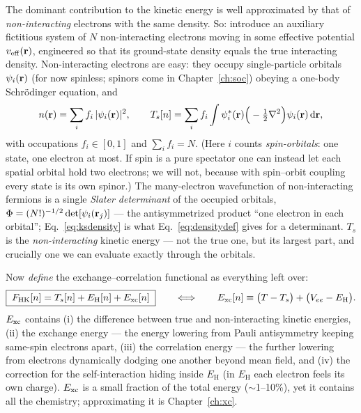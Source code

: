 The dominant contribution to the kinetic energy is well approximated by that
of \emph{non-interacting} electrons with the same density. So: introduce an
auxiliary fictitious system of $N$ non-interacting electrons moving in some
effective potential $v_{\mathrm{eff}}(\mathbf{r})$, engineered so that its ground-state
density equals the true interacting density. Non-interacting electrons are
easy: they occupy single-particle orbitals $\psi_i(\mathbf{r})$ (for now spinless;
spinors come in Chapter~\ref{ch:soc}) obeying a one-body Schr\"odinger
equation, and
\begin{equation}
n(\mathbf{r}) = \sum_{i} f_i\, |\psi_i(\mathbf{r})|^2 ,
\qquad
T_s[n] = \sum_i f_i \int \psi_i^*(\mathbf{r})
\Big(-\tfrac{1}{2}\nabla^2\Big) \psi_i(\mathbf{r})\,\mathrm{d}\mathbf{r},
\label{eq:ksdensity}
\end{equation}
with occupations $f_i \in [0,1]$ and $\sum_i f_i = N$. (Here $i$ counts
\emph{spin-orbitals}: one state, one electron at most. If spin is a pure
spectator one can instead let each spatial orbital hold two electrons; we
will not, because with spin--orbit coupling every state is its own spinor.)
The many-electron wavefunction of non-interacting fermions is a single
\emph{Slater determinant} of the occupied orbitals,
$\Phi = (N!)^{-1/2}\det[\psi_i(\mathbf{r}_j)]$ --- the antisymmetrized product
``one electron in each orbital''; Eq.~\eqref{eq:ksdensity} is
what Eq.~\eqref{eq:densitydef} gives for a determinant.
$T_s$ is the \emph{non-interacting} kinetic energy --- not the true one, but
its largest part, and crucially one we can evaluate exactly through the
orbitals.

Now \emph{define} the exchange--correlation functional as everything left
over:
\begin{equation}
\boxed{\;
F_{\mathrm{HK}}[n] = T_s[n] + E_{\mathrm H}[n] + E_{\mathrm{xc}}[n]
\;}
\qquad\Longleftrightarrow\qquad
E_{\mathrm{xc}}[n] \equiv \big(T - T_s\big) + \big(V_{ee} - E_{\mathrm H}\big).
\label{eq:excdef}
\end{equation}
$E_{\mathrm{xc}}$ contains (i) the difference between true and non-interacting kinetic
energies, (ii) the exchange energy --- the energy lowering from Pauli
antisymmetry keeping same-spin electrons apart, (iii) the correlation energy
--- the further lowering from electrons dynamically dodging one another
beyond mean field, and (iv) the correction for the self-interaction hiding
inside $E_{\mathrm H}$ (in $E_{\mathrm H}$ each electron feels its own
charge). $E_{\mathrm{xc}}$ is a small fraction of the total energy ($\sim$1--10\%), yet
it contains all the chemistry; approximating it is Chapter~\ref{ch:xc}.

